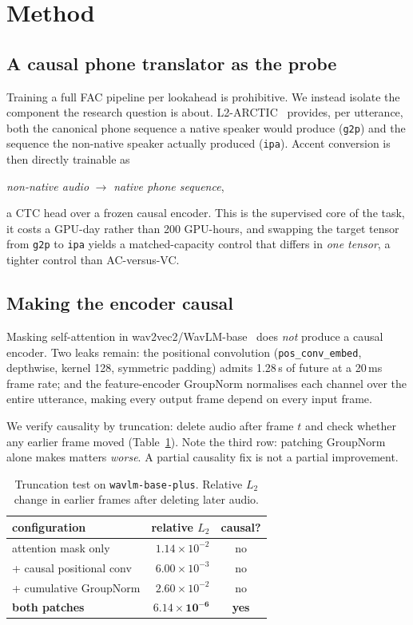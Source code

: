 \documentclass{article}
\begin{document}
\section{Method}

\subsection{A causal phone translator as the probe}
\label{sec:method-translator}

Training a full FAC pipeline per lookahead is prohibitive. We instead isolate
the component the research question is about. L2-ARCTIC~\cite{l2arctic2018}
provides, per utterance, both the canonical phone sequence a native speaker
would produce (\texttt{g2p}) and the sequence the non-native speaker actually
produced (\texttt{ipa}). Accent conversion is then directly trainable as
\begin{center}
\emph{non-native audio} $\rightarrow$ \emph{native phone sequence},
\end{center}
a CTC head over a frozen causal encoder. This is the supervised core of the
task, it costs a GPU-day rather than 200 GPU-hours, and swapping the target
tensor from \texttt{g2p} to \texttt{ipa} yields a matched-capacity control that
differs in \emph{one tensor}, a tighter control than AC-versus-VC.

\subsection{Making the encoder causal}
\label{sec:causal}

Masking self-attention in wav2vec2/WavLM-base~\cite{wavlm2022, wav2vec2} does
\emph{not} produce a causal encoder. Two leaks remain: the positional
convolution (\texttt{pos\_conv\_embed}, depthwise, kernel 128, symmetric
padding) admits 1.28\,s of future at a 20\,ms frame rate; and the
feature-encoder GroupNorm normalises each channel over the entire utterance,
making every output frame depend on every input frame.

We verify causality by truncation: delete audio after frame $t$ and check
whether any earlier frame moved (Table~\ref{tab:causal}). Note the third row:
patching GroupNorm alone makes matters \emph{worse}. A partial causality fix is
not a partial improvement.

\begin{table}[t]
\centering\small
\caption{Truncation test on \texttt{wavlm-base-plus}. Relative $L_2$ change in
earlier frames after deleting later audio.}
\label{tab:causal}
\begin{tabular}{lrc}
\toprule
configuration & relative $L_2$ & causal? \\
\midrule
attention mask only        & $1.14\times10^{-2}$ & no \\
\quad + causal positional conv & $6.00\times10^{-3}$ & no \\
\quad + cumulative GroupNorm   & $2.60\times10^{-2}$ & no \\
\textbf{both patches}      & $\mathbf{6.14\times10^{-6}}$ & \textbf{yes} \\
\bottomrule
\end{tabular}
\end{table}
\end{document}
